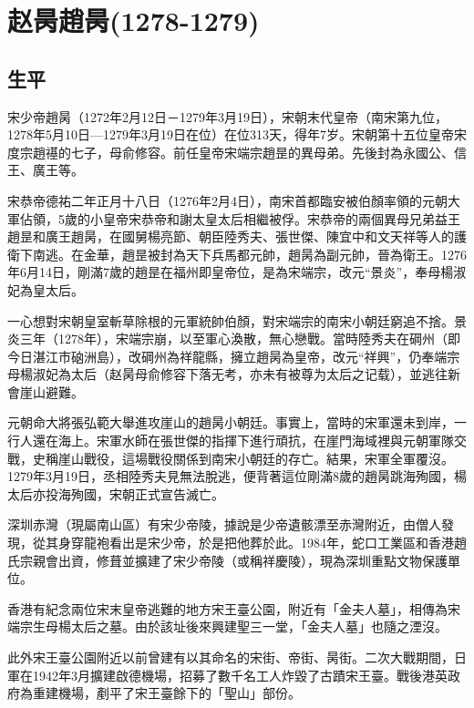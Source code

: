 
\section{赵昺趙昺\tiny(1278-1279)}

\subsection{生平}

宋少帝趙昺（1272年2月12日－1279年3月19日），宋朝末代皇帝（南宋第九位，1278年5月10日—1279年3月19日在位）在位313天，得年7岁。宋朝第十五位皇帝宋度宗趙禥的七子，母俞修容。前任皇帝宋端宗趙昰的異母弟。先後封為永國公、信王、廣王等。

宋恭帝德祐二年正月十八日（1276年2月4日），南宋首都臨安被伯顏率領的元朝大軍佔領，5歲的小皇帝宋恭帝和謝太皇太后相繼被俘。宋恭帝的兩個異母兄弟益王趙昰和廣王趙昺，在國舅楊亮節、朝臣陸秀夫、張世傑、陳宜中和文天祥等人的護衛下南逃。在金華，趙昰被封為天下兵馬都元帥，趙昺為副元帥，晉為衛王。1276年6月14日，剛滿7歲的趙昰在福州即皇帝位，是為宋端宗，改元“景炎”，奉母楊淑妃為皇太后。

一心想對宋朝皇室斬草除根的元軍統帥伯顏，對宋端宗的南宋小朝廷窮追不捨。景炎三年（1278年），宋端宗崩，以至軍心渙散，無心戀戰。當時陸秀夫在碙州（即今日湛江市硇洲島），改碙州為祥龍縣，擁立趙昺為皇帝，改元“祥興”，仍奉端宗母楊淑妃為太后（赵昺母俞修容下落无考，亦未有被尊为太后之记载），並逃往新會崖山避難。

元朝命大將張弘範大舉進攻崖山的趙昺小朝廷。事實上，當時的宋軍還未到岸，一行人還在海上。宋軍水師在張世傑的指揮下進行頑抗，在崖門海域裡與元朝軍隊交戰，史稱崖山戰役，這場戰役關係到南宋小朝廷的存亡。結果，宋軍全軍覆沒。1279年3月19日，丞相陸秀夫見無法脫逃，便背著這位剛滿8歲的趙昺跳海殉國，楊太后亦投海殉國，宋朝正式宣告滅亡。

深圳赤灣（現屬南山區）有宋少帝陵，據說是少帝遺骸漂至赤灣附近，由僧人發現，從其身穿龍袍看出是宋少帝，於是把他葬於此。1984年，蛇口工業區和香港趙氏宗親會出資，修葺並擴建了宋少帝陵（或稱祥慶陵），現為深圳重點文物保護單位。

香港有紀念兩位宋末皇帝逃難的地方宋王臺公園，附近有「金夫人墓」，相傳為宋端宗生母楊太后之墓。由於該址後來興建聖三一堂，「金夫人墓」也隨之湮沒。

此外宋王臺公園附近以前曾建有以其命名的宋街、帝街、昺街。二次大戰期間，日軍在1942年3月擴建啟德機場，招募了數千名工人炸毀了古蹟宋王臺。戰後港英政府為重建機場，剷平了宋王臺餘下的「聖山」部份。

